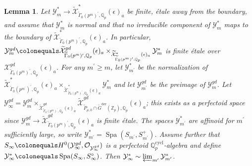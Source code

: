 \documentclass{amsart}
\newtheorem{lemma}[subsubsection]{Lemma}
\theoremstyle{remark}
\numberwithin{equation}{subsection}
\newcommand{\Q}{\QQ}
\newcommand{\Z}{\ZZ}
\newcommand{\QQ}{{\mathbb Q}}
\newcommand{\ZZ}{{\mathbb Z}}
\newcommand{\cO}{{\mathcal O}}
\newcommand{\cX}{{\mathcal X}}
\newcommand{\cY}{{\mathcal Y}}
\newcommand{\Zp}{\Z_p}
\newcommand{\Qp}{\Q_p}
\DeclareMathOperator{\Spa}{Spa}
\newcommand*{\invlim}{\varprojlim}
\newcommand{\cycl}{\mathrm{cycl}}
\newcommand{\tGam}{\widetilde{\Gamma}}
\newcommand{\tG}{\widetilde{G}}
\newcommand{\tP}{\widetilde{P}}
\newcommand{\wt}{\widetilde}
\newcommand{\defeq}{\colonequals}
\renewcommand{\(}{\left(}
\renewcommand{\)}{\right)}
\begin{document}
\begin{lemma}\label{3.2.24} \cite[Lemma 3.2.24(iii)]{scholze-galois}
Let $\cY_{m}^{\ast} \to \wt{\cX}^{\ast}_{\tGam_{0}(p^m)^\prime,\Qp}(\epsilon)_{a}$ be finite, \'etale away from the boundary, and assume that $\cY^{\ast}_{m}$ is normal and that no irreducible component of $\cY_{m}^{\ast}$ maps to the boundary of $\wt{\cX}^{\ast}_{\tGam_{0}(p^{m})^\prime,\Qp}(\epsilon)_{a}$. In particular, $\cY^{gd}_{m}\defeq \wt{\cX}^{gd}_{\tGam_{0}(p^{m})^{\prime},\Qp}(\epsilon)_{a} \times_{\wt{\cX}^{\ast}_{\tGam_{0}(p^{m})^{\prime},\Qp}(\epsilon)_{a}} \cY_{m}^{\ast}$ is finite \'etale over $\cX^{gd}_{\tGam_{0}(p^{m})^{\prime},\Qp}(\epsilon)_{a}$. For any $m^{\prime} \geq m$, let $\cY_{m^{\prime}}^{\ast}$ be the normalization of $\wt{\cX}^{\ast}_{\tGam_{0}(p^{m^{\prime}})^{\prime},\Qp}(\epsilon)_{a}\times_{\wt{\cX}^{\ast}_{\tGam_{0}(p^{m})^{\prime},\Qp}(\epsilon)_{a}} \cY_{m}^{\ast}$ and let $\cY_{m^{\prime}}^{gd}$ be the preimage of $\cY_{m}^{gd}$. Let $\cY_{\infty}^{gd}=\cY_{m}^{gd} \times_{\wt{\cX}^{gd}_{\tGam_{0}(p^{m})^{\prime},\Qp}(\epsilon)_{a}} \wt{\cX}^{gd}_{\tP_{\mu,0}\cap \tG^\mathrm{der}(\Zp), \Qp}(\epsilon)_{a}$; this exists as a perfectoid space since $\cY_{m}^{gd} \to \wt{\cX}^{gd}_{\tGam_{0}(p^{m})^{\prime},\Qp}(\epsilon)_{a}$ is finite \'etale. 
The spaces $\cY_{m^{\prime}}^{\ast}$ are affinoid for $m^{\prime}$ sufficiently large, so write $\cY_{m^{\prime}}^{\ast}=\Spa(S_{m^{\prime}},S_{m^{\prime}}^{+})$. Assume further that $S_{\infty} \defeq H^{0}(\cY^{gd}_{\infty},\cO_{\cY_{\infty}^{gd}})$ is a perfectoid $\Qp^{\cycl}$-algebra and define $\cY_{\infty}^{\ast} \defeq \Spa(S_{\infty},S_{\infty}^{\circ})$. Then $\cY_{\infty}^{\ast} \sim \invlim_{m^{\prime}}\cY_{m^{\prime}}^{\ast}$.
\end{lemma}
\end{document}
